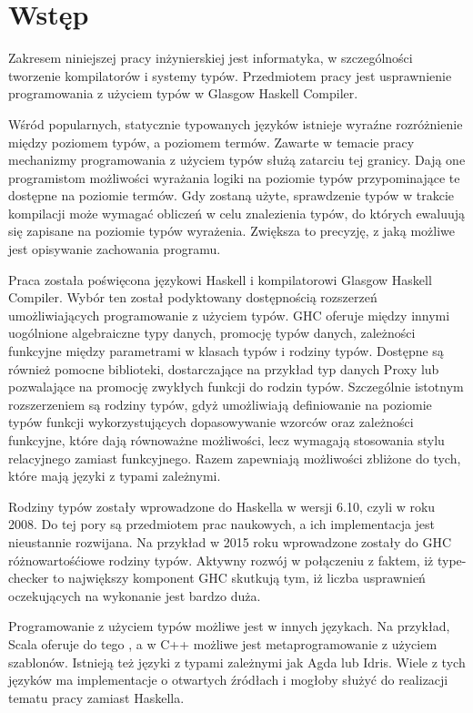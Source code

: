 \chapter{Wstęp}\label{chap:wstep}

Zakresem niniejszej pracy inżynierskiej jest informatyka, w szczególności tworzenie kompilatorów i systemy typów. Przedmiotem pracy jest usprawnienie programowania z użyciem typów w Glasgow Haskell Compiler.

Wśród popularnych, statycznie typowanych języków istnieje wyraźne rozróżnienie między poziomem typów, a poziomem termów. Zawarte w temacie pracy mechanizmy programowania z użyciem typów służą zatarciu tej granicy. Dają one programistom możliwości wyrażania logiki na poziomie typów przypominające te dostępne na poziomie termów. Gdy zostaną użyte, sprawdzenie typów w trakcie kompilacji może wymagać obliczeń w celu znalezienia typów, do których ewaluują się zapisane na poziomie typów wyrażenia. Zwiększa to precyzję, z jaką możliwe jest opisywanie zachowania programu.

Praca została poświęcona językowi Haskell i kompilatorowi Glasgow Haskell Compiler. Wybór ten został podyktowany dostępnością rozszerzeń umożliwiających programowanie z użyciem typów. GHC oferuje między innymi uogólnione algebraiczne typy danych, promocję typów danych, zależności funkcyjne między parametrami w klasach typów i rodziny typów. Dostępne są również pomocne biblioteki, dostarczające na przykład typ danych Proxy lub pozwalające na promocję zwykłych funkcji do rodzin typów. Szczególnie istotnym rozszerzeniem są rodziny typów, gdyż umożliwiają definiowanie na poziomie typów funkcji wykorzystujących dopasowywanie wzorców oraz zależności funkcyjne, które dają równoważne możliwości, lecz wymagają stosowania stylu relacyjnego zamiast funkcyjnego. Razem zapewniają możliwości zbliżone do tych, które mają języki z typami zależnymi.

Rodziny typów zostały wprowadzone do Haskella w wersji 6.10, czyli w roku 2008. Do tej pory są przedmiotem prac naukowych, a ich implementacja jest nieustannie rozwijana. Na przykład w 2015 roku wprowadzone zostały do GHC różnowartośćiowe rodziny typów. Aktywny rozwój w połączeniu z faktem, iż type-checker to największy komponent GHC\cite{AOSA} skutkują tym, iż liczba usprawnień oczekujących na wykonanie jest bardzo duża.

Programowanie z użyciem typów możliwe jest w innych językach. Na przykład, Scala oferuje do tego , a w C++ możliwe jest metaprogramowanie z użyciem szablonów. Istnieją też języki z typami zależnymi jak Agda lub Idris. Wiele z tych języków ma implementacje o otwartych źródłach i mogłoby służyć do realizacji tematu pracy zamiast Haskella.

